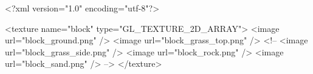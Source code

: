 <?xml version="1.0" encoding="utf-8"?>

<texture name="block" type="GL_TEXTURE_2D_ARRAY">
  <image url="block_ground.png" />
  <image url="block_grass_top.png" />
  <!--
  <image url="block_grass_side.png" />
  <image url="block_rock.png" />
  <image url="block_sand.png" />
  -->
</texture>

